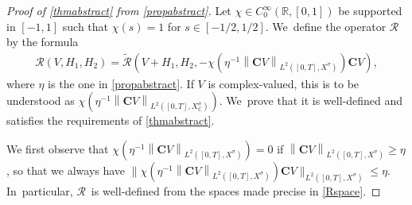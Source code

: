 \documentclass[11pt]{article}
\newcommand\bnor[2]{\bigl\|#1\bigr\|_{#2}}%
\theoremstyle{definition}
\newcommand{\R}{\mathbb{R}}
\newcommand{\bC}{\boldsymbol{C}}
\newcommand\nor[2]{\left\|#1\right\|_{#2}}
\begin{document}
\begin{proof}[Proof of \cref{thmabstract} from \cref{propabstract}]
Let $\chi\in C^{\infty}_{0}(\R,[0,1])$ be supported in $[-1,1]$ such that $\chi(s)=1$ for $s\in [-1/2,1/2]$. We~define the operator $\mathcal{R}$ by the formula
\begin{align}\label{defR}
\mathcal{R}(V,H_{1},H_{2})=\mathcal{\widetilde{R}}(V+H_{1},H_{2},- \chi(\eta^{-1} \nor{\bC V}{L^{2}([0,T],X^{\sigma})}) \bC V),
\end{align}
where $\eta$ is the one in \cref{propabstract}. If $V$ is complex-valued, this is to be understood as $\chi(\eta^{-1} \nor{\bC V}{L^{2}([0,T],X^{\sigma}_{\mathbb{C}})})$. We~prove that it is well-defined and satisfies the requirements of \cref{thmabstract}.

We first observe that $\chi(\eta^{-1} \nor{\bC V}{L^{2}([0,T],X^{\sigma})}) =0$ if $\nor{ \bC V}{L^{2}([0,T],X^{\sigma})}\geq \eta$, so that we always have $\bnor{ \chi(\eta^{-1} \nor{ \bC V}{L^{2}([0,T],X^{\sigma})}) \bC V}{L^{2}([0,T],X^{\sigma})}\leq \eta$. In~particular, $\mathcal{R}$~is well-defined from the spaces made precise in \eqref{Rspace}.


\end{proof}
\end{document}
